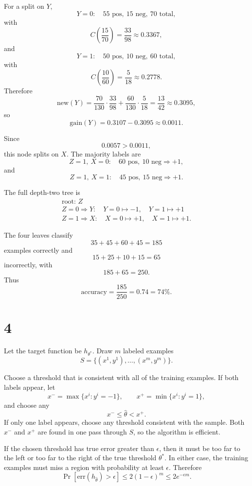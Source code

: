 \documentclass[11pt]{article}
\begin{document}
For a split on \(Y\),
\[
Y=0:\quad55\text{ pos},\ 15\text{ neg},\ 70\text{ total},
\]
with
\[
C\!\left(\frac{15}{70}\right)
=
\frac{33}{98}
\approx0.3367,
\]
and
\[
Y=1:\quad50\text{ pos},\ 10\text{ neg},\ 60\text{ total},
\]
with
\[
C\!\left(\frac{10}{60}\right)
=
\frac{5}{18}
\approx0.2778.
\]
Therefore
\[
\mathrm{new}(Y)
=
\frac{70}{130}\cdot\frac{33}{98}
+
\frac{60}{130}\cdot\frac{5}{18}
=
\frac{13}{42}
\approx0.3095,
\]
so
\[
\mathrm{gain}(Y)
=
0.3107-0.3095
\approx0.0011.
\]

Since
\[
0.0057>0.0011,
\]
this node splits on \(X\). The majority labels are
\[
Z=1,\ X=0:
\quad60\text{ pos},\ 10\text{ neg}
\Rightarrow +1,
\]
and
\[
Z=1,\ X=1:
\quad45\text{ pos},\ 15\text{ neg}
\Rightarrow +1.
\]

The full depth-two tree is
\[
\boxed{
\begin{array}{c}
\text{root: }Z\\[2mm]
Z=0\Rightarrow Y:
\quad Y=0\mapsto -1,\quad Y=1\mapsto +1\\[1mm]
Z=1\Rightarrow X:
\quad X=0\mapsto +1,\quad X=1\mapsto +1.
\end{array}
}
\]

The four leaves classify
\[
35+45+60+45=185
\]
examples correctly and
\[
15+25+10+15=65
\]
incorrectly, with
\[
185+65=250.
\]
Thus
\[
\boxed{
\mathrm{accuracy}
=
\frac{185}{250}
=
0.74
=
74\%.
}
\]

\section*{4}

Let the target function be \(h_{\theta^*}\). Draw \(m\) labeled examples
\[
S=\{(x^1,y^1),\ldots,(x^m,y^m)\}.
\]

Choose a threshold that is consistent with all of the training examples. If
both labels appear, let
\[
x^-=\max\{x^i:y^i=-1\},
\qquad
x^+=\min\{x^i:y^i=1\},
\]
and choose any
\[
x^-\le\hat\theta<x^+.
\]
If only one label appears, choose any threshold consistent with the sample.
Both \(x^-\) and \(x^+\) are found in one pass through \(S\), so the
algorithm is efficient.

If the chosen threshold has true error greater than \(\epsilon\), then it
must be too far to the left or too far to the right of the true threshold
\(\theta^*\). In either case, the training examples must miss a region with
probability at least \(\epsilon\). Therefore
\[
\Pr[\mathrm{err}(h_{\hat\theta})>\epsilon]
\le
2(1-\epsilon)^m
\le
2e^{-\epsilon m}.
\]
\end{document}
